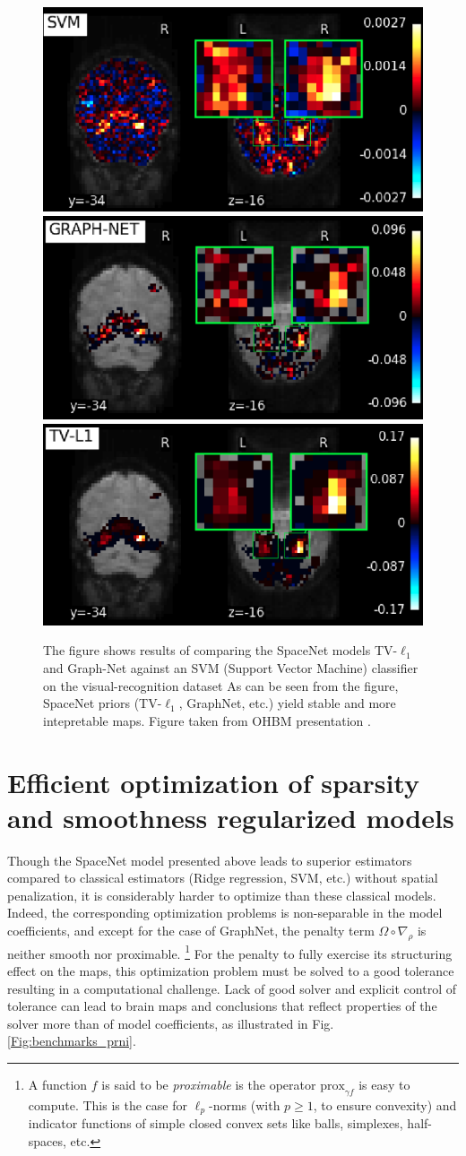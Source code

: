   \begin{figure}[!htb] 
  \includegraphics[width=.325\linewidth]{figures/svm.png}
  \includegraphics[width=.325\linewidth]{figures/graphnet.png}
  \includegraphics[width=.325\linewidth]{figures/tvl1.png}  
  \caption{The figure shows results of comparing the SpaceNet  models TV-$\ell_1$ and
    Graph-Net against an SVM (Support Vector Machine) classifier on
    the visual-recognition dataset   \citep{haxby2001}
    As can be seen from the figure, SpaceNet priors (TV-$\ell_1$, GraphNet, etc.)
    yield stable and more intepretable maps. Figure taken from OHBM
    presentation   \citep{spacenetohbm}.}
  \label{fig:spacenet_maps}
\end{figure}

\chapter{Efficient optimization of sparsity and smoothness regularized models}\label{chap:efficient_opt}

Though the SpaceNet model presented above leads to superior estimators compared to classical estimators (Ridge regression, SVM, etc.) without spatial penalization, it is considerably harder to optimize than these classical models. Indeed, the corresponding optimization problems is non-separable in the model coefficients, and except for the case of GraphNet,
the penalty term $\Omega \circ \nabla_\rho$ is neither smooth nor proximable.
\footnote{ A function $f$ is said to be \textit{proximable} is the operator $\text{prox}_{\gamma f}$ is easy to compute. This is the case for $\ell_p$-norms  (with $ p \ge 1$, to ensure convexity) and indicator functions of simple closed convex sets like balls, simplexes, half-spaces, etc.}
For the penalty to fully exercise its
structuring effect on the maps, this optimization problem must be
solved to a good tolerance resulting in a computational challenge. Lack of good solver and explicit control of
tolerance can lead to brain maps and conclusions that reflect
properties of the solver more than of model coefficients, as illustrated in Fig. \ref{Fig:benchmarks_prni}.

